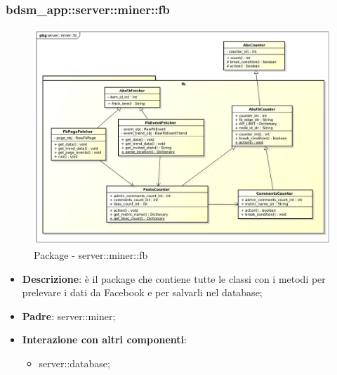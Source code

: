 \subsubsection{bdsm\_app::server::miner::fb} %
\label{ssub:bdsm_app_server_miner_fb}
\begin{figure}[htbp]
	\centering
	\centerline{\includegraphics[scale=0.3]{./images/server/miner_fb.pdf}}
	\caption{Package - server::miner::fb}
\end{figure}

\begin{itemize}
  \item \textbf{Descrizione}: è il package che contiene tutte le classi con i metodi per prelevare i dati da Facebook e per salvarli nel database;
  \item \textbf{Padre}: server::miner;
  \item \textbf{Interazione con altri componenti}:
  	\begin{itemize}
  		\item server::database;
  	\end{itemize}
\end{itemize}	

